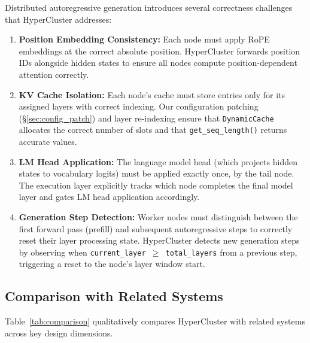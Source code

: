 \documentclass[runningheads]{llncs}
\begin{document}
Distributed autoregressive generation introduces several correctness challenges that HyperCluster addresses:

\begin{enumerate}
    \item \textbf{Position Embedding Consistency:} Each node must apply RoPE embeddings at the correct absolute position. HyperCluster forwards position IDs alongside hidden states to ensure all nodes compute position-dependent attention correctly.

    \item \textbf{KV Cache Isolation:} Each node's cache must store entries only for its assigned layers with correct indexing. Our configuration patching (\S\ref{sec:config_patch}) and layer re-indexing ensure that \texttt{DynamicCache} allocates the correct number of slots and that \texttt{get\_seq\_length()} returns accurate values.

    \item \textbf{LM Head Application:} The language model head (which projects hidden states to vocabulary logits) must be applied exactly once, by the tail node. The execution layer explicitly tracks which node completes the final model layer and gates LM head application accordingly.

    \item \textbf{Generation Step Detection:} Worker nodes must distinguish between the first forward pass (prefill) and subsequent autoregressive steps to correctly reset their layer processing state. HyperCluster detects new generation steps by observing when \texttt{current\_layer $\geq$ total\_layers} from a previous step, triggering a reset to the node's layer window start.
\end{enumerate}

\subsection{Comparison with Related Systems}

Table~\ref{tab:comparison} qualitatively compares HyperCluster with related systems across key design dimensions.
\end{document}
